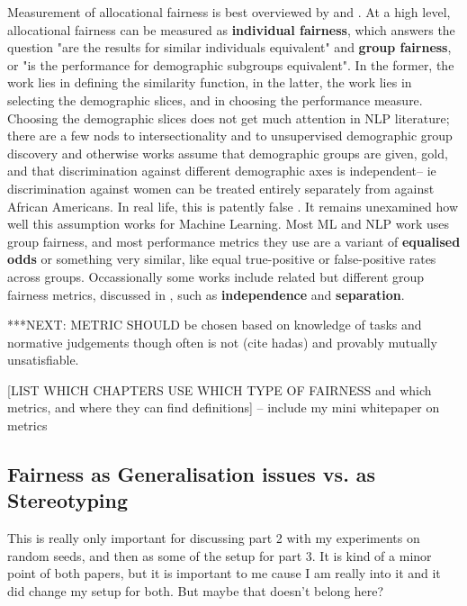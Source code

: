 Measurement of allocational fairness is best overviewed by \citet{hutchinson_mitchell_2019} and \citet{barocas-hardt-narayanan}. At a high level, allocational fairness can be measured as \textbf{individual fairness}, which answers the question "are the results for similar individuals equivalent" and \textbf{group fairness}, or "is the performance for demographic subgroups equivalent". In the former, the work lies in defining the similarity function, in the latter, the work lies in selecting the demographic slices, and in choosing the performance measure. Choosing the demographic slices does not get much attention in NLP literature; there are a few nods to intersectionality \citep{} and to unsupervised demographic group discovery \citep{zhao-chang-2020-logan} and otherwise works assume that demographic groups are given, gold, and that discrimination against different demographic axes is independent-- ie discrimination against women can be treated entirely separately from against African Americans. In real life, this is patently false \citep{some intersectionality thing}. It remains unexamined how well this assumption works for Machine Learning. Most ML and NLP work uses group fairness, and most performance metrics they use are a variant of \textbf{equalised odds} \citep{hardt2016equality} or something very similar, like equal true-positive or false-positive rates across groups. Occassionally some works include related but different group fairness metrics, discussed in \citet{barocas-hardt-narayanan}, such as \textbf{independence} and \textbf{separation}. 

***NEXT:
METRIC SHOULD be chosen based on knowledge of tasks and normative judgements though often is not (cite hadas) and provably mutually unsatisfiable. 

[LIST WHICH CHAPTERS USE WHICH TYPE OF FAIRNESS and which metrics, and where they can find definitions]
-- include my mini whitepaper on metrics





\subsection{Fairness as Generalisation issues vs. as Stereotyping}
This is really only important for discussing part 2 with my experiments on random seeds, and then as some of the setup for part 3. It is kind of a minor point of both papers, but it is important to me cause I am really into it and it did change my setup for both. But maybe that doesn't belong here?

